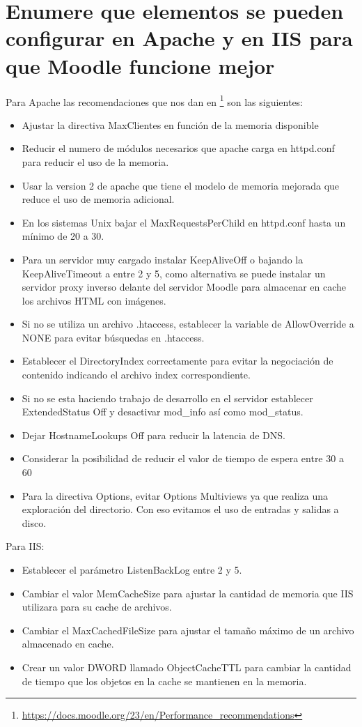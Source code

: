 \section{Enumere que elementos se pueden configurar en Apache y en IIS para que Moodle funcione mejor}
Para Apache las recomendaciones que nos dan en \footnote{\url{https://docs.moodle.org/23/en/Performance_recommendations}}
son las siguientes:
\begin{itemize}
\item Ajustar la directiva MaxClientes en función de la memoria disponible
\item Reducir el numero de módulos necesarios que apache carga en httpd.conf para reducir el uso de la memoria.
\item Usar la version 2 de apache que tiene el modelo de memoria mejorada que reduce el uso de memoria adicional.
\item En los sistemas Unix bajar el MaxRequestsPerChild en httpd.conf hasta un mínimo de 20 a 30.
\item Para un servidor muy cargado instalar KeepAliveOff o bajando la KeepAliveTimeout a entre 2 y 5, como alternativa se puede instalar un servidor proxy inverso delante del servidor Moodle para almacenar en cache los archivos HTML con imágenes. 
\item Si no se utiliza un archivo .htaccess, establecer la variable de AllowOverride a NONE para evitar búsquedas en .htaccess.
\item Establecer el DirectoryIndex correctamente para evitar la negociación de contenido indicando el archivo index correspondiente.
\item Si no se esta haciendo trabajo de desarrollo en el servidor establecer ExtendedStatus Off y desactivar mod\_info así como mod\_status.
\item Dejar HostnameLookups Off para reducir la latencia de DNS.
\item Considerar la posibilidad de reducir el valor de tiempo de espera entre 30 a 60
\item Para la directiva Options, evitar Options Multiviews ya que realiza una exploración del directorio. Con eso evitamos el uso de entradas y salidas a disco.
\end{itemize}
Para IIS:
\begin{itemize}
\item Establecer el parámetro ListenBackLog entre 2 y 5.
\item Cambiar el valor MemCacheSize para ajustar la cantidad de memoria que IIS utilizara para su cache de archivos.
\item Cambiar el MaxCachedFileSize para ajustar el tamaño máximo de un archivo almacenado en cache.
\item Crear un valor DWORD llamado ObjectCacheTTL para cambiar la cantidad de tiempo que los objetos en la cache se mantienen en la memoria.
\end{itemize}
